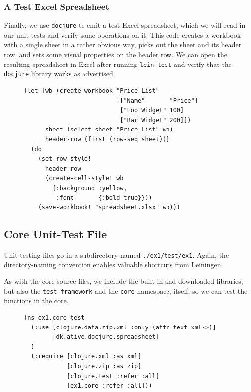\documentclass[11pt]{article}
\begin{document}
\subsubsection{A Test Excel Spreadsheet}
\label{sec-2-3-3}
Finally, we use \verb|docjure| to emit a test Excel spreadsheet, which
we will read in our unit tests and verify some operations on it. This
code creates a workbook with a single sheet in a rather obvious way,
picks out the sheet and its header row, and sets some visual
properties on the header row. We can open the resulting spreadsheet in
Excel after running \verb|lein test| and verify that the
\verb|docjure| library works as advertised.
\begin{figure}[H]
\label{docjure-test-spreadsheet}
\begin{verbatim}
(let [wb (create-workbook "Price List"
                          [["Name"       "Price"]
                           ["Foo Widget" 100]
                           ["Bar Widget" 200]])
      sheet (select-sheet "Price List" wb)
      header-row (first (row-seq sheet))]
  (do
    (set-row-style!
      header-row
      (create-cell-style! wb
        {:background :yellow,
         :font       {:bold true}}))
    (save-workbook! "spreadsheet.xlsx" wb)))
\end{verbatim}
\end{figure}
\subsection{Core Unit-Test File}
\label{sec-2-4}
Unit-testing files go in a subdirectory named \verb+./ex1/test/ex1+.
Again, the directory-naming convention enables valuable shortcuts
from Leiningen.

As with the core source files, we include the built-in and downloaded
libraries, but also the \verb|test framework| and the \verb|core|
namespace, itself, so we can test the functions in the core.
\begin{figure}[H]
\label{main-test-namespace}
\begin{verbatim}
(ns ex1.core-test
  (:use [clojure.data.zip.xml :only (attr text xml->)]
        [dk.ative.docjure.spreadsheet]
  )
  (:require [clojure.xml :as xml]
            [clojure.zip :as zip]
            [clojure.test :refer :all]
            [ex1.core :refer :all]))
\end{verbatim}
\end{figure}
\end{document}
